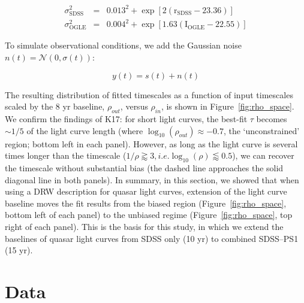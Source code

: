 \documentclass[twocolumn]{aastex62}
\begin{document}
\begin{eqnarray}
\sigma_{\mathrm{SDSS}}^{2} &=& 0.013^{2} + \exp{[2 (\mathrm{r_{SDSS}}-23.36)]} \\
\sigma_{\mathrm{OGLE}}^{2} &=& 0.004^{2} + \exp{[1.63 (\mathrm{I_{OGLE}} - 22.55)]}
\end{eqnarray}

To simulate observational conditions, we add the Gaussian noise $n(t) = \mathcal{N}(0,\sigma(t))$:

\begin{equation}
y(t) = s(t) + n(t) 
\end{equation}

The resulting distribution of fitted timescales  as a function of input timescales scaled by the  8 yr baseline, $\rho_{out}$, versus $\rho_{in}$, is shown in Figure~\ref{fig:rho_space}. We confirm the findings of K17: for short light curves, the best-fit $\tau$ becomes ${\sim}1/5$ of the light curve length (where $\log_{10}{(\rho_{out})} \approx -0.7$, the `unconstrained' region; bottom left in each panel). However, as long as the light curve is several times longer than the timescale ($1/\rho \gtrapprox 3, i.e. \log_{10}{(\rho)} \lessapprox 0.5$), we can recover the timescale without substantial bias (the dashed line approaches the solid diagonal line in both panels). In summary, in this section, we showed that when using a DRW description for quasar light curves, extension of the light curve baseline moves the fit results from the biased region (Figure~\ref{fig:rho_space}, bottom left of each panel) to the unbiased regime (Figure~\ref{fig:rho_space}, top right of each panel). This is the basis for this study,  in which we extend the baselines of quasar light curves from SDSS only (10 yr) to combined SDSS--PS1 (15 yr). 


\section{Data}
\label{sec:data}
\end{document}
